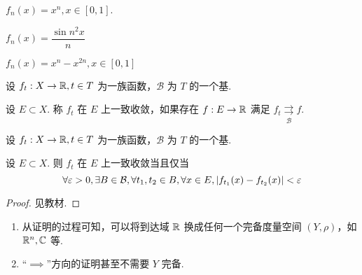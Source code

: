 \begin{example}
    $f_n(x)=x^n,x\in[0,1]$.
\end{example}

\begin{example}
    $f_n(x)=\dfrac{\sin n^2x}{n}$
\end{example}

\begin{example}
    $f_n(x)=x^n-x^{2n},x\in[0,1]$
\end{example}


\begin{example}
    设 $f_t:X\to\mathbb{R},t\in T$ 为一族函数，$\mathcal{B}$ 为 $T$ 的一个基.

    设 $E\subset X$. 称 $f_t$ 在 $E$ 上一致收敛，如果存在 $f:E\to\mathbb{R}$ 满足 $f_t\underset{\mathcal{B}}{\rightrightarrows}f$.
\end{example}

\begin{theorem}[Cauchy]
    设 $f_t:X\to\mathbb{R},t\in T$ 为一族函数，$\mathcal{B}$ 为 $T$ 的一个基.

    设 $E\subset X$. 则 $f_t$ 在 $E$ 上一致收敛当且仅当
$$
\forall\varepsilon>0,\exists B\in\mathcal{B},\forall t_1,t_2\in B,\forall x\in E,\left\lvert{f_{t_1}(x)-f_{t_2}(x)}\right\rvert<\varepsilon
$$
\end{theorem}
\begin{proof}
    见教材.
\end{proof}

\begin{hint}
    \begin{enumerate}
        \item 从证明的过程可知，可以将到达域 $\mathbb{R}$ 换成任何一个完备度量空间 $(Y,\rho)$，如 $\mathbb{R}^n,\mathbb{C}$ 等.
        
        \item “$\implies$”方向的证明甚至不需要 $Y$ 完备.
    \end{enumerate}
\end{hint}
